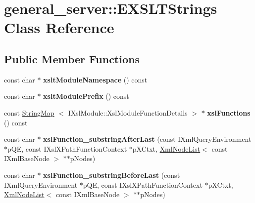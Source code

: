 \hypertarget{classgeneral__server_1_1EXSLTStrings}{\section{general\-\_\-server\-:\-:\-E\-X\-S\-L\-T\-Strings \-Class \-Reference}
\label{classgeneral__server_1_1EXSLTStrings}
}
\subsection*{\-Public \-Member \-Functions}
\begin{DoxyCompactItemize}
\item 
\hypertarget{classgeneral__server_1_1EXSLTStrings_a8ae8d5948d76abc497d3305f18cf0d0c}{const char $\ast$ {\bfseries xslt\-Module\-Namespace} () const }\label{classgeneral__server_1_1EXSLTStrings_a8ae8d5948d76abc497d3305f18cf0d0c}

\item 
\hypertarget{classgeneral__server_1_1EXSLTStrings_ab76a19a644e766c8cb549cf669aeff1f}{const char $\ast$ {\bfseries xslt\-Module\-Prefix} () const }\label{classgeneral__server_1_1EXSLTStrings_ab76a19a644e766c8cb549cf669aeff1f}

\item 
\hypertarget{classgeneral__server_1_1EXSLTStrings_ab944564bd7b00a0023b8523800f683bf}{const \hyperlink{classgeneral__server_1_1StringMap}{\-String\-Map}\*
$<$ \-I\-Xsl\-Module\-::\-Xsl\-Module\-Function\-Details $>$ $\ast$ {\bfseries xsl\-Functions} () const }\label{classgeneral__server_1_1EXSLTStrings_ab944564bd7b00a0023b8523800f683bf}

\item 
\hypertarget{classgeneral__server_1_1EXSLTStrings_a4bce1e6a7bd59d0f7ddd12ff089b3c5c}{const char $\ast$ {\bfseries xsl\-Function\-\_\-substring\-After\-Last} (const \-I\-Xml\-Query\-Environment $\ast$p\-Q\-E, const \-I\-Xsl\-X\-Path\-Function\-Context $\ast$p\-X\-Ctxt, \hyperlink{classgeneral__server_1_1XmlNodeList}{\-Xml\-Node\-List}$<$ const \-I\-Xml\-Base\-Node $>$ $\ast$$\ast$p\-Nodes)}\label{classgeneral__server_1_1EXSLTStrings_a4bce1e6a7bd59d0f7ddd12ff089b3c5c}

\item 
\hypertarget{classgeneral__server_1_1EXSLTStrings_a17af910629c7535b412db74b44a64d59}{const char $\ast$ {\bfseries xsl\-Function\-\_\-substring\-Before\-Last} (const \-I\-Xml\-Query\-Environment $\ast$p\-Q\-E, const \-I\-Xsl\-X\-Path\-Function\-Context $\ast$p\-X\-Ctxt, \hyperlink{classgeneral__server_1_1XmlNodeList}{\-Xml\-Node\-List}$<$ const \-I\-Xml\-Base\-Node $>$ $\ast$$\ast$p\-Nodes)}\label{classgeneral__server_1_1EXSLTStrings_a17af910629c7535b412db74b44a64d59}


\end{DoxyCompactItemize}

